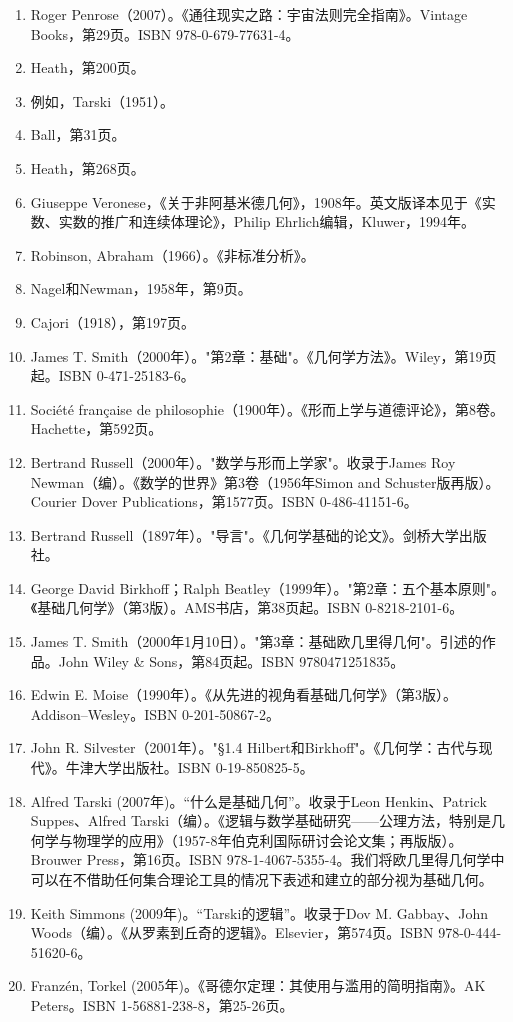\begin{enumerate}
\item Roger Penrose（2007）。《通往现实之路：宇宙法则完全指南》。Vintage Books，第29页。ISBN 978-0-679-77631-4。
\item Heath，第200页。  
\item 例如，Tarski（1951）。  
\item Ball，第31页。  
\item Heath，第268页。  
\item Giuseppe Veronese，《关于非阿基米德几何》，1908年。英文版译本见于《实数、实数的推广和连续体理论》，Philip Ehrlich编辑，Kluwer，1994年。  
\item Robinson, Abraham（1966）。《非标准分析》。  
\item Nagel和Newman，1958年，第9页。  
\item Cajori（1918），第197页。
\item James T. Smith（2000年）。"第2章：基础"。《几何学方法》。Wiley，第19页起。ISBN 0-471-25183-6。  
\item Société française de philosophie（1900年）。《形而上学与道德评论》，第8卷。Hachette，第592页。  
\item Bertrand Russell（2000年）。"数学与形而上学家"。收录于James Roy Newman（编）。《数学的世界》第3卷（1956年Simon and Schuster版再版）。Courier Dover Publications，第1577页。ISBN 0-486-41151-6。  
\item Bertrand Russell（1897年）。"导言"。《几何学基础的论文》。剑桥大学出版社。  
\item George David Birkhoff；Ralph Beatley（1999年）。"第2章：五个基本原则"。《基础几何学》（第3版）。AMS书店，第38页起。ISBN 0-8218-2101-6。  
\item James T. Smith（2000年1月10日）。"第3章：基础欧几里得几何"。引述的作品。John Wiley & Sons，第84页起。ISBN 9780471251835。  
\item Edwin E. Moise（1990年）。《从先进的视角看基础几何学》（第3版）。Addison–Wesley。ISBN 0-201-50867-2。  
\item John R. Silvester（2001年）。"§1.4 Hilbert和Birkhoff"。《几何学：古代与现代》。牛津大学出版社。ISBN 0-19-850825-5。
\item Alfred Tarski (2007年)。“什么是基础几何”。收录于Leon Henkin、Patrick Suppes、Alfred Tarski（编）。《逻辑与数学基础研究——公理方法，特别是几何学与物理学的应用》（1957-8年伯克利国际研讨会论文集；再版版）。Brouwer Press，第16页。ISBN 978-1-4067-5355-4。我们将欧几里得几何学中可以在不借助任何集合理论工具的情况下表述和建立的部分视为基础几何。  
\item Keith Simmons (2009年)。“Tarski的逻辑”。收录于Dov M. Gabbay、John Woods（编）。《从罗素到丘奇的逻辑》。Elsevier，第574页。ISBN 978-0-444-51620-6。  
\item Franzén, Torkel (2005年)。《哥德尔定理：其使用与滥用的简明指南》。AK Peters。ISBN 1-56881-238-8，第25-26页。
\end{enumerate}
